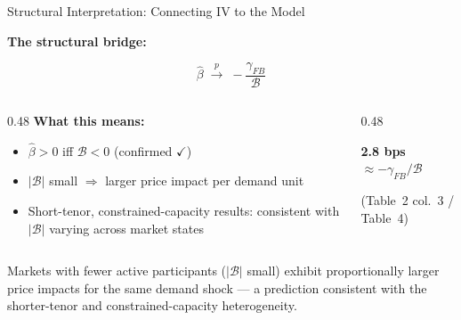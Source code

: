 \documentclass[aspectratio=169, 10pt]{beamer}
\newcommand{\calB}{\mathcal{B}}      %
\newcommand{\resultbox}[1]{%
  \begin{center}
    {\large\color{resultcol}\textbf{#1}}
  \end{center}}
\begin{document}
\begin{frame}{Structural Interpretation: Connecting IV to the Model}

  \begin{center}
    \textbf{The structural bridge:}
  \end{center}

  \[
    \hat\beta \;\xrightarrow{p}\; -\frac{\gamma_{FB}}{\calB}
  \]

  \bigskip

  \begin{columns}
    \begin{column}{0.48\textwidth}
      \textbf{What this means:}
      \begin{itemize}
        \item $\hat\beta > 0$ iff $\calB < 0$ (confirmed $\checkmark$)
        \item $|\calB|$ small $\Rightarrow$ larger price impact per demand unit
        \item Short-tenor, constrained-capacity results: consistent with $|\calB|$ varying
              across market states
      \end{itemize}
    \end{column}
    \begin{column}{0.48\textwidth}
      \begin{center}
        \resultbox{2.8 bps $\approx -\gamma_{FB}/\calB$}
        {\color{dimgray}\small(Table~2 col.~3 / Table~4)}
      \end{center}
    \end{column}
  \end{columns}

  \bigskip

  {\color{dimgray}\small
    Markets with fewer active participants ($|\calB|$ small) exhibit proportionally larger
    price impacts for the same demand shock --- a prediction consistent with the
    shorter-tenor and constrained-capacity heterogeneity.}

\end{frame}
\end{document}
